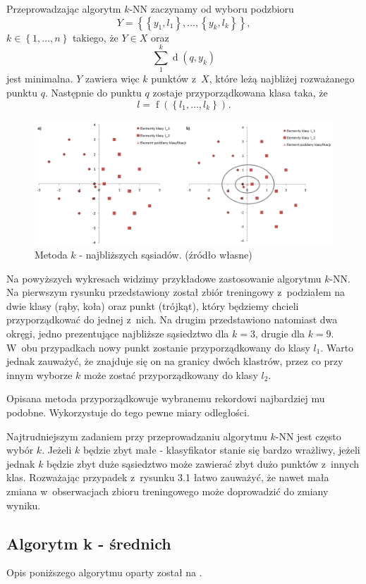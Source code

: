 \documentclass[12pt,a4paper]{report}
\newcommand{\set}[1]{\left\lbrace {#1} \right\rbrace}
\newcommand{\distance}[2]{\operatorname{d}\left({#1}, {#2} \right)}
\newcommand{\f}[2][]{\operatorname{f}\left( {#2} \right)_{#1}}
\begin{document}
Przeprowadzając algorytm $k$-NN zaczynamy od wyboru podzbioru
$$
\mathit{Y}=\set{\set{y_1,l_1},\ldots,\set{y_k,l_k}}, 
$$
$k\in\set{1,\ldots,n}$ takiego, że $\mathit{Y} \in \mathit{X}$ oraz 
$$
\sum_1^k \distance{q}{y_k}
$$ 
jest minimalna. $\mathit{Y}$ zawiera więc $k$ punktów z~$\mathit{X}$, które leżą najbliżej rozważanego punktu $q$. Następnie do punktu $q$ zostaje przyporządkowana klasa taka, że $$
l=\f{\set{l_1,\ldots,l_k}}.
$$
\begin{center}
\begin{figure}[H]
\centering
\includegraphics[scale=0.5]{obrazy/kNN.PNG} 
\caption{Metoda $k$ - najbliższych sąsiadów. (źródło własne)}
\end{figure}
\end{center}

Na powyższych wykresach widzimy przykładowe zastosowanie algorytmu $k$-NN. Na pierwszym rysunku przedstawiony został zbiór treningowy z~podziałem na dwie klasy (rąby, koła) oraz punkt (trójkąt), który będziemy chcieli przyporządkować do jednej z~nich. Na drugim przedstawiono natomiast dwa okręgi, jedno prezentujące najbliższe sąsiedztwo dla $k = 3$, drugie dla $k = 9$. W~obu przypadkach nowy punkt zostanie przyporządkowany do klasy $l_1$. Warto jednak zauważyć, że znajduje się on na granicy dwóch klastrów, przez co przy innym wyborze $k$ może zostać przyporządkowany do klasy $l_2$.

Opisana metoda przyporządkowuje wybranemu rekordowi najbardziej mu podobne. Wykorzystuje do tego pewne miary odległości.

Najtrudniejszym zadaniem przy przeprowadzaniu algorytmu $k$-NN jest często wybór $k$. Jeżeli $k$ będzie zbyt małe - klasyfikator stanie się bardzo wrażliwy, jeżeli jednak $k$ będzie zbyt duże sąsiedztwo może zawierać zbyt dużo punktów z~innych klas. Rozważając przypadek z~rysunku 3.1 łatwo zauważyć, że nawet mała zmiana w~obserwacjach zbioru treningowego może doprowadzić do zmiany wyniku.

\subsection{Algorytm k - średnich} 
Opis poniższego algorytmu oparty został na {\citep[Sec 2.3.1]{ascgdpds}}.
\end{document}
